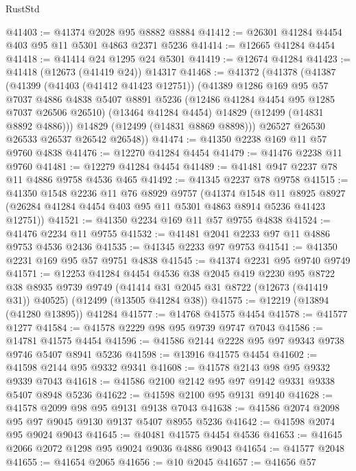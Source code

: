 \begin{lexlean}{RustStd}
\begin{coremodule}
@41403 := @41374 @2028 @95 @8882 @8884
@41412 := @26301 @41284 @4454 @403 @95 @11 @5301 @4863 @2371 @5236
@41414 := @12665 @41284 @4454
@41418 := @41414 @24 @1295 @24 @5301
@41419 := @12674 @41284
@41423 := @41418 (@12673 (@41419 @24)) @14317
@41468 := @41372
    (@41378
      (@41387
        (@41399
          (@41403 (@41412 @41423 @12751))
          (@41389
            @1286
            @169
            @95
            @57
            @7037
            @4886
            @4838
            @5407
            @8891
            @5236
            (@12486 @41284 @4454 @95 @1285 @7037 @26506 @26510)
            (@13464 @41284 @4454)
            @14829
            (@12499 (@14831 @8892 @4886)))
          @14829
          (@12499 (@14831 @8869 @8898)))
        @26527
        @26530
        @26533
        @26537
        @26542
        @26548))
@41474 := @41350 @2238 @169 @11 @57 @9760 @4838
@41476 := @12270 @41284 @4454
@41479 := @41476 @2238 @11 @9760
@41481 := @12279 @41284 @4454
@41489 := @41481 @947 @2237 @78 @11 @4886 @9758 @4536 @465
@41492 := @41345 @2237 @78 @9758
@41515 := @41350
    @1548
    @2236
    @11
    @76
    @8929
    @9757
    (@41374
      @1548
      @11
      @8925
      @8927
      (@26284 @41284 @4454 @403 @95 @11 @5301 @4863 @8914 @5236 @41423 @12751))
@41521 := @41350 @2234 @169 @11 @57 @9755 @4838
@41524 := @41476 @2234 @11 @9755
@41532 := @41481 @2041 @2233 @97 @11 @4886 @9753 @4536 @2436
@41535 := @41345 @2233 @97 @9753
@41541 := @41350 @2231 @169 @95 @57 @9751 @4838
@41545 := @41374 @2231 @95 @9740 @9749
@41571 := @12253
    @41284
    @4454
    @4536
    @38
    @2045
    @419
    @2230
    @95
    @8722
    @38
    @8935
    @9739
    @9749
    (@41414 @31 @2045 @31 @8722 (@12673 (@41419 @31)) @40525)
    (@12499 (@13505 @41284 @38))
@41575 := @12219 (@13894 (@41280 @13895)) @41284
@41577 := @14768 @41575 @4454
@41578 := @41577 @1277
@41584 := @41578 @2229 @98 @95 @9739 @9747 @7043
@41586 := @14781 @41575 @4454
@41596 := @41586 @2144 @2228 @95 @97 @9343 @9738 @9746 @5407 @8941 @5236
@41598 := @13916 @41575 @4454
@41602 := @41598 @2144 @95 @9332 @9341
@41608 := @41578 @2143 @98 @95 @9332 @9339 @7043
@41618 := @41586 @2100 @2142 @95 @97 @9142 @9331 @9338 @5407 @8948 @5236
@41622 := @41598 @2100 @95 @9131 @9140
@41628 := @41578 @2099 @98 @95 @9131 @9138 @7043
@41638 := @41586 @2074 @2098 @95 @97 @9045 @9130 @9137 @5407 @8955 @5236
@41642 := @41598 @2074 @95 @9024 @9043
@41645 := @40481 @41575 @4454 @4536
@41653 := @41645 @2066 @2072 @1298 @95 @9024 @9036 @4886 @9043
@41654 := @41577 @2048
@41655 := @41654 @2065
@41656 := @10 @2045
@41657 := @41656 @57

\end{coremodule}
\end{lexlean}
